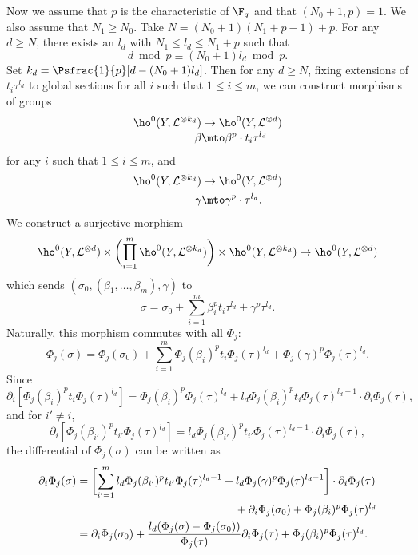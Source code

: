 \Changel
Now we assume that $p$ is the characteristic of $\F_q$ and that $(N_0+1, p)=1$. We also assume that $N_1\geq N_0$. Take $N= (N_0+1)(N_1+p-1)+p$. For any $d\geq N$, there exists an $l_d$ with $N_1\leq l_d\leq N_1+p$ such that\vspace*{-3pt}
\[
d\bmod p \equiv (N_0+1)l_d\bmod p.
\]
Set $k_d=\Psfrac{1}{p}[d-(N_0+1)l_d]$. Then for any $d\geq N$, fixing extensions of $t_i\tau^{l_d}$ to global sections for all $i$ such that $1\leq i\leq m$, we can construct morphisms of groups\vspace*{-3pt}
\begin{align*}
\ho^0(Y, \mathcal{L}^{\otimes k_d}) & \to \ho^0(Y, \mathcal{L}^{\otimes d}) \\[-3pt]
\beta & \mto \beta^p\cdot t_i\tau^{l_d}
\end{align*}
for any $i$ such that $1\leq i\leq m$, and
\begin{align*}
\ho^0(Y, \mathcal{L}^{\otimes k_d}) & \to \ho^0(Y, \mathcal{L}^{\otimes d}) \\
\gamma & \mto \gamma^p\cdot \tau^{l_d}.
\end{align*}
We construct a surjective morphism
\[
\ho^0(Y,\mathcal{L}^{\otimes d})\times \biggl(\prod_{i=1}^m \ho^0(Y,\mathcal{L}^{\otimes k_d}) \biggr) \times \ho^0(Y, \mathcal{L}^{\otimes k_d}) \to \ho^0(Y, \mathcal{L}^{\otimes d})
\]
which sends $(\sigma_0, (\beta_1,\dots, \beta_m), \gamma)$ to
\[
\sigma=\sigma_0+\sum_{i=1}^m \beta_i^pt_i\tau^{l_d}+\gamma^p\tau^{l_d}.
\]
Naturally, this morphism commutes with all $\Phi_j$:
\[
\Phi_j(\sigma)=\Phi_j(\sigma_0)+\sum_{i=1}^m \Phi_j(\beta_i)^pt_i\Phi_j(\tau)^{l_d}+\Phi_j(\gamma)^p\Phi_j(\tau)^{l_d}.
\]
Since
\[
\partial_i[\Phi_j(\beta_i)^p t_i \Phi_j(\tau)^{l_d}]=\Phi_j(\beta_i)^p \Phi_j(\tau)^{l_d} + l_d \Phi_j(\beta_i)^pt_i\Phi_j(\tau)^{l_d-1}\cdot \partial_i \Phi_j(\tau),
\]
and for $i'\not=i$,
\[
\partial_i[\Phi_j(\beta_{i'})^p t_{i'} \Phi_j(\tau)^{l_d}]=l_d \Phi_j(\beta_{i'})^p t_{i'}\Phi_j(\tau)^{l_d-1}\cdot \partial_i \Phi_j(\tau),
\]
the differential of $\Phi_j(\sigma)$ can be written as
\begin{align*}
\partial_i\Phi_j(\sigma) &= \biggl[ \sum_{i'=1}^m l_d\Phi_j(\beta_{i'})^p t_{i'}\Phi_j(\tau)^{l_d-1}+l_d \Phi_j(\gamma)^p\Phi_j(\tau)^{l_d-1} \biggr]\cdot \partial_i \Phi_j(\tau)\\
& \hspace*{5cm}+\partial_i\Phi_j(\sigma_0)+\Phi_j(\beta_i)^p\Phi_j(\tau)^{l_d} \\
&= \partial_i\Phi_j(\sigma_0)+ \frac{l_d(\Phi_j(\sigma)-\Phi_j(\sigma_0))}{\Phi_j(\tau)}\partial_i\Phi_j(\tau)+ \Phi_j(\beta_i)^p \Phi_j(\tau)^{l_d}.
\end{align*}
